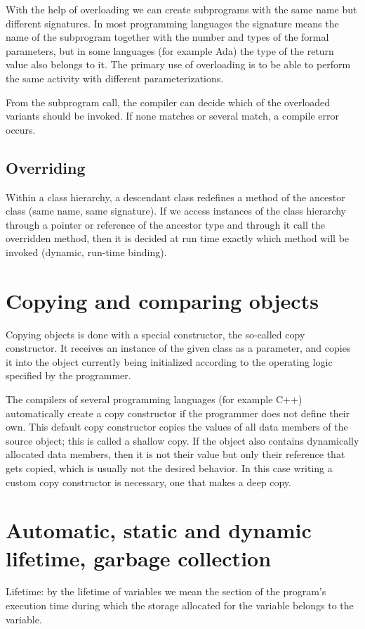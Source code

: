 \documentclass[margin=0px]{article}
\begin{document}
With the help of overloading we can create subprograms with the same name but different signatures. In most programming languages the signature means the name of the subprogram together with the number and types of the formal parameters, but in some languages (for example Ada) the type of the return value also belongs to it. The primary use of overloading is to be able to perform the same activity with different parameterizations.

From the subprogram call, the compiler can decide which of the overloaded variants should be invoked. If none matches or several match, a compile error occurs.

\subsection{Overriding}
Within a class hierarchy, a descendant class redefines a method of the ancestor class (same name, same signature). If we access instances of the class hierarchy through a pointer or reference of the ancestor type and through it call the overridden method, then it is decided at run time exactly which method will be invoked (dynamic, run-time binding).

\section{Copying and comparing objects}

Copying objects is done with a special constructor, the so-called copy constructor. It receives an instance of the given class as a parameter, and copies it into the object currently being initialized according to the operating logic specified by the programmer.

The compilers of several programming languages (for example C++) automatically create a copy constructor if the programmer does not define their own. This default copy constructor copies the values of all data members of the source object; this is called a shallow copy. If the object also contains dynamically allocated data members, then it is not their value but only their reference that gets copied, which is usually not the desired behavior. In this case writing a custom copy constructor is necessary, one that makes a deep copy.

\section{Automatic, static and dynamic lifetime, garbage collection}
Lifetime: by the lifetime of variables we mean the section of the program's execution time during which the storage allocated for the variable belongs to the variable.
\end{document}
